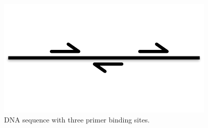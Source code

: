 \begin{figure}[h!]
\includegraphics[scale=0.5]{figures/apdx-examples/apdx-exa9.pdf}
\caption{DNA sequence with three primer binding sites.}
\label{f:apdx:exa10}
\end{figure}

\begin{figure}[h!]
\vspace{5in}
\end{figure}
